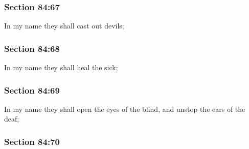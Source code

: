 	\subsubsection{Section 84:67} %
		\label{DC84-67}

		In my name they shall cast out devils;


	\subsubsection{Section 84:68} %
		\label{DC84-68}

		In my name they shall heal the sick;


	\subsubsection{Section 84:69} %
		\label{DC84-69}

		In my name they shall open the eyes of the blind, and unstop the ears of the deaf;


	\subsubsection{Section 84:70} %
		\label{DC84-70}

